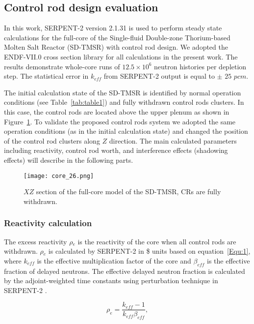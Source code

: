 \subsection{Control rod design evaluation}

In this work, SERPENT-2 version 2.1.31 \cite{leppanen2014serpent} is used to perform steady state calculations for the full-core of the Single-fluid Double-zone Thorium-based Molten Salt Reactor (SD-TMSR) with control rod design. We adopted the ENDF-VII.0 cross section library for all calculations in the present work. The results demonstrate whole-core runs of $12.5\times 10^6$ neutron histories per depletion step. The statistical error in $k_{eff}$ from SERPENT-2 output is equal to $\pm$ $25$ $pcm$.

The initial calculation state of the SD-TMSR is identified by normal operation conditions (see Table~\ref{tab:table1}) and fully withdrawn control rods clusters. In this case, the control rods are located above the upper plenum as shown in Figure~\ref{fig:core_26}. To validate the proposed control rods system we adopted the same operation conditions (as in the initial calculation state) and changed the position of the control rod clusters along $Z$ direction. The main calculated parameters including reactivity, control rod worth, and interference effects (shadowing effects) will describe in the following parts.

\begin{figure}[t!] %
	\centering
	\texttt{[image: core\_26.png]}
	\caption{$XZ$ section of the full-core model of the SD-TMSR, CRs are fully withdrawn.}
	\label{fig:core_26}
\end{figure}

\subsubsection{Reactivity calculation}

The excess reactivity $\rho$$_e$ is the reactivity of the core when all control rods are withdrawn. $\rho$$_e$ is calculated by SERPENT-2 in \$ units based on equation~\ref{Equ:1}, where $k_{eff}$ is the effective multiplication factor of the core and $\beta_{eff}$ is the effective fraction of delayed neutrons. The effective delayed neutron fraction is calculated by the adjoint-weighted time constants using perturbation technique in SERPENT-2 \cite{leppanen2014calculation}.

\begin{equation}
\label{Equ:1}
{{\rho}_{e}}=\dfrac{{k_{eff}}-1}{{k_{eff}}{{\beta}_{eff}}},
\end{equation}

